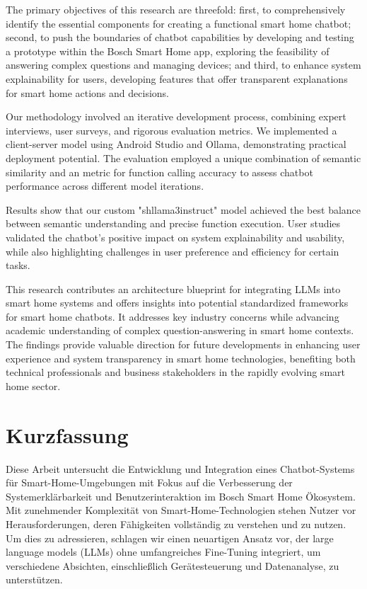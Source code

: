 \documentclass[
  a4paper,  %
  twoside,  %
  bibliography=totoc,
  headsepline,
  cleardoublepage=empty,
  parskip=half,
  draft=false
]{scrbook}
\begin{document}
The primary objectives of this research are threefold: first, to comprehensively identify the essential components for creating a functional smart home chatbot; second, to push the boundaries of chatbot capabilities by developing and testing a prototype within the Bosch Smart Home app, exploring the feasibility of answering complex questions and managing devices; and third, to enhance system explainability for users, developing features that offer transparent explanations for smart home actions and decisions.

Our methodology involved an iterative development process, combining expert interviews, user surveys, and rigorous evaluation metrics. We implemented a client-server model using Android Studio and Ollama, demonstrating practical deployment potential. The evaluation employed a unique combination of semantic similarity and an metric for function calling accuracy to assess chatbot performance across different model iterations.

Results show that our custom "shllama3instruct" model achieved the best balance between semantic understanding and precise function execution. User studies validated the chatbot's positive impact on system explainability and usability, while also highlighting challenges in user preference and efficiency for certain tasks.

This research contributes an architecture blueprint for integrating LLMs into smart home systems and offers insights into potential standardized frameworks for smart home chatbots. It addresses key industry concerns while advancing academic understanding of complex question-answering in smart home contexts. The findings provide valuable direction for future developments in enhancing user experience and system transparency in smart home technologies, benefiting both technical professionals and business stakeholders in the rapidly evolving smart home sector.
\cleardoublepage

\section*{Kurzfassung}
Diese Arbeit untersucht die Entwicklung und Integration eines Chatbot-Systems für Smart-Home-Umgebungen mit Fokus auf die Verbesserung der Systemerklärbarkeit und Benutzerinteraktion im Bosch Smart Home Ökosystem. Mit zunehmender Komplexität von Smart-Home-Technologien stehen Nutzer vor Herausforderungen, deren Fähigkeiten vollständig zu verstehen und zu nutzen. Um dies zu adressieren, schlagen wir einen neuartigen Ansatz vor, der large language models (LLMs) ohne umfangreiches Fine-Tuning integriert, um verschiedene Absichten, einschließlich Gerätesteuerung und Datenanalyse, zu unterstützen.
\end{document}
